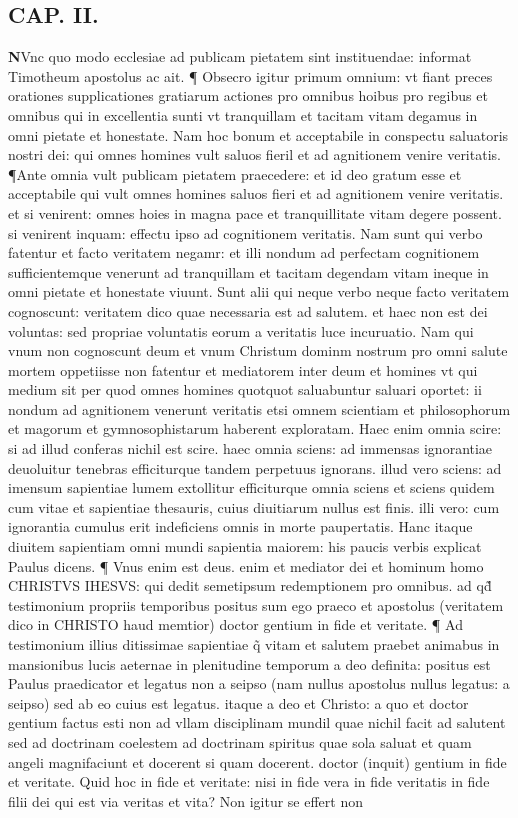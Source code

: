 \documentclass{article}
\begin{document}
\begin{pages}
\endnumbering\beginnumbering\section{CAP. II.}\pstart \huge\textbf{N}\normalsize Vnc quo modo ecclesiae ad publicam pietatem sint instituendae: informat Timotheum apostolus ac ait. ¶ Obsecro igitur primum omnium: vt fiant preces orationes supplicationes gratiarum actiones pro omnibus hoibus pro regibus et omnibus qui in excellentia sunti vt tranquillam et tacitam vitam degamus in omni pietate et honestate. Nam hoc bonum et acceptabile in conspectu saluatoris nostri dei: qui omnes homines vult saluos fieril et ad agnitionem venire veritatis. ¶Ante omnia vult publicam pietatem praecedere: et id deo gratum esse et acceptabile qui vult omnes homines saluos fieri et ad agnitionem venire veritatis. et si venirent: omnes hoies in magna pace et tranquillitate vitam degere possent. si venirent inquam: effectu ipso ad cognitionem veritatis. Nam sunt qui verbo fatentur et facto veritatem negamr: et illi nondum ad perfectam cognitionem sufficientemque venerunt ad tranquillam et tacitam degendam vitam ineque in omni pietate et honestate viuunt. Sunt alii qui neque verbo neque facto veritatem cognoscunt: veritatem dico quae necessaria est ad salutem. et haec non est dei voluntas: sed propriae voluntatis eorum a veritatis luce incuruatio. Nam qui vnum non cognoscunt deum et vnum Christum dominm nostrum pro omni salute mortem oppetiisse non fatentur et mediatorem inter deum et homines vt qui medium sit per quod omnes homines quotquot saluabuntur saluari oportet: ii nondum ad agnitionem venerunt veritatis etsi omnem scientiam et philosophorum et magorum et gymnosophistarum haberent exploratam. Haec enim omnia scire: si ad illud conferas nichil est scire. haec omnia sciens: ad immensas ignorantiae deuoluitur tenebras efficiturque tandem perpetuus ignorans. illud vero sciens: ad imensum sapientiae lumem extollitur efficiturque omnia sciens et sciens quidem cum vitae et sapientiae thesauris, cuius diuitiarum nullus est finis. illi vero: cum ignorantia cumulus erit indeficiens omnis in morte paupertatis. Hanc itaque diuitem sapientiam omni mundi sapientia maiorem: his paucis verbis explicat Paulus dicens. ¶ Vnus enim est deus. enim et mediator dei et hominum homo CHRISTVS IHESVS: qui dedit semetipsum redemptionem pro omnibus. ad qd̃ testimonium propriis  temporibus positus sum ego praeco et apostolus (veritatem dico in CHRISTO haud memtior) doctor gentium in fide et veritate. ¶ Ad testimonium illius ditissimae sapientiae q̃ vitam et salutem praebet animabus in mansionibus lucis aeternae in plenitudine temporum a deo definita: positus est Paulus praedicator et legatus non a seipso (nam nullus apostolus nullus legatus: a seipso) sed ab eo cuius est legatus. itaque a deo et Christo: a quo et doctor gentium factus esti non ad vllam disciplinam mundil quae nichil facit ad salutent sed ad doctrinam coelestem  ad doctrinam spiritus quae sola saluat et quam angeli magnifaciunt et docerent si quam docerent. doctor (inquit) gentium in fide et veritate. Quid hoc in fide et veritate: nisi in fide vera in fide veritatis in fide filii dei qui est via veritas et vita? Non igitur se effert non 
\end{pages}
\end{document}
